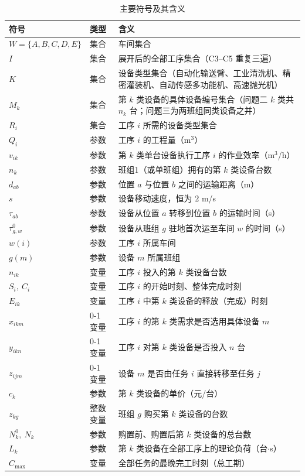 \documentclass[12pt,a4paper]{article}
\begin{document}
\begin{table}[H]
\centering
\caption{主要符号及其含义}
\small
\begin{tabular}{@{}llL{8.6cm}@{}}
\toprule
符号 & 类型 & 含义 \\
\midrule
$W=\{A,B,C,D,E\}$ & 集合 & 车间集合 \\
$I$ & 集合 & 展开后的全部工序集合（C3--C5 重复三遍） \\
$K$ & 集合 & 设备类型集合（自动化输送臂、工业清洗机、精密灌装机、自动传感多功能机、高速抛光机） \\
$M_k$ & 集合 & 第 $k$ 类设备的具体设备编号集合（问题二 $k$ 类共 $n_k$ 台；问题三为两班组同类设备之并） \\
$R_i$ & 集合 & 工序 $i$ 所需的设备类型集合 \\
$Q_i$ & 参数 & 工序 $i$ 的工程量（m$^3$） \\
$v_{ik}$ & 参数 & 第 $k$ 类单台设备执行工序 $i$ 的作业效率（m$^3$/h） \\
$n_k$ & 参数 & 班组1（或单班组）拥有的第 $k$ 类设备台数 \\
$d_{ab}$ & 参数 & 位置 $a$ 与位置 $b$ 之间的运输距离（m） \\
$s$ & 参数 & 设备移动速度，恒为 $2$ m/s \\
$\tau_{ab}$ & 参数 & 设备从位置 $a$ 转移到位置 $b$ 的运输时间（s） \\
$\tau^{0}_{g,w}$ & 参数 & 设备从班组 $g$ 驻地首次运至车间 $w$ 的时间（s） \\
$w(i)$ & 参数 & 工序 $i$ 所属车间 \\
$g(m)$ & 参数 & 设备 $m$ 所属班组 \\
$n_{ik}$ & 变量 & 工序 $i$ 投入的第 $k$ 类设备台数 \\
$S_i,\ C_i$ & 变量 & 工序 $i$ 的开始时刻、整体完成时刻 \\
$E_{ik}$ & 变量 & 工序 $i$ 中第 $k$ 类设备的释放（完成）时刻 \\
$x_{ikm}$ & 0-1 变量 & 工序 $i$ 的第 $k$ 类需求是否选用具体设备 $m$ \\
$y_{ikn}$ & 0-1 变量 & 工序 $i$ 对第 $k$ 类设备是否投入 $n$ 台 \\
$z_{ijm}$ & 0-1 变量 & 设备 $m$ 是否由任务 $i$ 直接转移至任务 $j$ \\
$c_k$ & 参数 & 第 $k$ 类设备的单价（元/台） \\
$z_{kg}$ & 整数变量 & 班组 $g$ 购买第 $k$ 类设备的台数 \\
$N_k^0,\ N_k$ & 参数 & 购置前、购置后第 $k$ 类设备的总台数 \\
$L_k$ & 参数 & 第 $k$ 类设备在全部工序上的理论负荷（台$\cdot$s） \\
$C_{\max}$ & 变量 & 全部任务的最晚完工时刻（总工期） \\
\bottomrule
\end{tabular}
\end{table}
\end{document}
